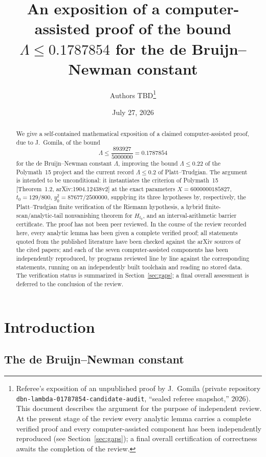\documentclass[11pt]{article}
\title{An exposition of a computer-assisted proof of the bound
$\Lambda\le 0.1787854$ for the de Bruijn--Newman constant}
\author{Authors TBD\thanks{Referee's exposition of an unpublished
proof by J.~Gomila (private repository
\texttt{dbn-lambda-01787854-candidate-audit}, ``sealed referee snapshot,''
2026). This document describes the argument for the purpose of
independent review. At the present stage of the review every
analytic lemma carries a complete verified proof and every
computer-assisted component has been independently reproduced (see
Section~\ref{sec:gaps}); a final overall certification of
correctness awaits the completion of the review.}}
\date{July 27, 2026}
\theoremstyle{definition}
\newcommand{\LB}{\Lambda}
\begin{document}
\maketitle

\begin{abstract}
We give a self-contained mathematical exposition of a claimed computer-assisted proof, due to J.~Gomila, of the bound
\[
\LB\le\frac{893927}{5000000}=0.1787854
\]
for the de Bruijn--Newman constant $\LB$, improving the bound
$\LB\le0.22$ of the Polymath~15 project and the current record
$\LB\le0.2$ of Platt--Trudgian. The argument is intended to be
unconditional: it instantiates the criterion of Polymath~15
[Theorem~1.2, arXiv:1904.12438v2] at the exact parameters
$X=6000000185827$, $t_0=129/800$, $y_0^2=87677/2500000$, supplying its
three hypotheses by, respectively, the Platt--Trudgian finite
verification of the Riemann hypothesis, a hybrid finite-scan/analytic-tail
nonvanishing theorem for $H_{t_0}$, and an interval-arithmetic barrier
certificate. The proof has not been peer reviewed. In the course of
the review recorded here, every analytic lemma has been given a
complete verified proof; all statements quoted from the published
literature have been checked against the arXiv sources of the cited
papers; and each of the seven computer-assisted components has been
independently reproduced, by programs reviewed line by line against
the corresponding statements, running on an independently built
toolchain and reading no stored data. The verification status is
summarized in Section~\ref{sec:gaps}; a final overall assessment is
deferred to the conclusion of the review.
\end{abstract}

\tableofcontents

\section{Introduction}

\subsection{The de Bruijn--Newman constant}
\end{document}
